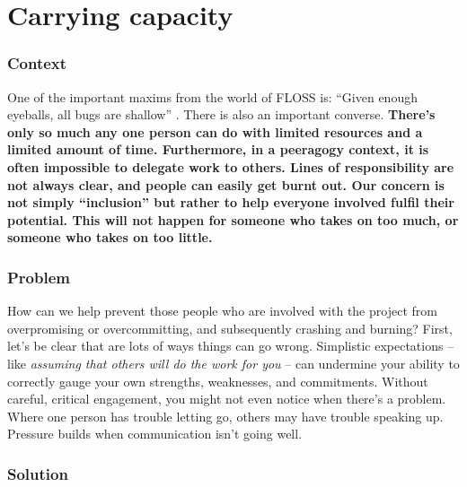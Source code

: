 \section{Carrying capacity}\label{sec:Carrying capacity}

\subsubsection*{Context}

One of the important maxims from the world of FLOSS is:
``Given enough eyeballs, all bugs are shallow'' \cite[p.~30]{raymond2001cathedral}.
There is also an important converse.
\textbf{There's only so much any one person can do with limited resources and a limited amount of time.
Furthermore, in a peeragogy context, it is often impossible to delegate work to others.
Lines of responsibility are not always clear, and people can easily get burnt out.
Our concern is not simply ``inclusion'' but rather to help everyone involved fulfil their potential.
This will not happen for someone who takes on too much, or someone who takes on too little.}

\subsubsection*{Problem}

How can we help prevent those people who are involved with the project from overpromising or overcommitting, and subsequently crashing and burning?  First, let's be clear that are lots of ways things can go wrong.  Simplistic expectations -- like \emph{assuming that others will do the work for you} \cite{torvalds-interview} -- can undermine your ability to correctly gauge your own strengths, weaknesses, and commitments.  Without careful, critical engagement, you might not even notice when there's a problem.  Where one person has trouble letting go, others may have trouble speaking up.  Pressure builds when communication isn't going well.  

\subsubsection*{Solution}

